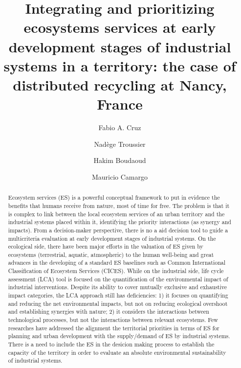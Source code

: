 \documentclass[]{elsarticle} %
\begin{document}
\begin{frontmatter}

  \title{Integrating and prioritizing ecosystems services at early development stages of industrial systems in a territory: the case of distributed recycling at Nancy, France}
    \author[UTT]{Fabio A. Cruz}
    \author[UTT]{Nadège Troussier}
  
    \author[UL]{Hakim Boudaoud}
  
    \author[UL]{Mauricio Camargo}
  
      \address[UTT]{Universite de Technologie de Troyes, Troyes, France}
    \address[UL]{ERPI, Université de Lorraine, F-54000 Nancy, France.}
  
  \begin{abstract}
  Ecosystem services (ES) is a powerful conceptual framework to put in evidence the benefits that humans receive from nature, most of time for free.
  The problem is that it is complex to link between the local ecosystem services of an urban territory and the industrial systems placed within it, identifying the priority interactions (as synergy and impacts).
  From a decision-maker perspective, there is no a aid decision tool to guide a multicriteria evaluation at early development stages of industrial systems.
  On the ecological side, there have been major efforts in the valuation of ES given by ecosystems (terrestrial, aquatic, atmospheric) to the human well-being and great advances in the developing of a standard ES baselines such as Common International Classification of Ecosystem Services (CICES).
  While on the industrial side, life cycle assessment (LCA) tool is focused on the quantification of the environmental impact of industrial interventions. Despite its ability to cover mutually exclusive and exhaustive impact categories, the LCA approach still has deficiencies: 1) it focuses on quantifying and reducing the net environmental impacts, but not on reducing ecological overshoot and establishing synergies with nature; 2) it considers the interactions between technological processes, but not the interactions between relevant ecosystems.
  Few researches have addressed the alignment the territorial priorities in terms of ES for planning and urban development with the supply/demand of ES by industrial systems.
  There is a need to include the ES in the desicion making process to establish the capacity of the territory in order to evaluate an absolute environmental sustainability of industrial systems.

\end{abstract}
\end{frontmatter}
\end{document}
